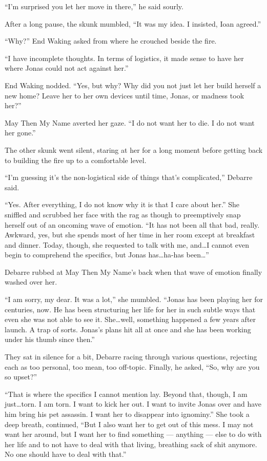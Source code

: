 ``I'm surprised you let her move in there,'' he said sourly.

After a long pause, the skunk mumbled, ``It was my idea. I insisted, Ioan agreed.''

``Why?'' End Waking asked from where he crouched beside the fire.

``I have incomplete thoughts. In terms of logistics, it made sense to have her where Jonas could not act against her.''

End Waking nodded. ``Yes, but why? Why did you not just let her build herself a new home? Leave her to her own devices until time, Jonas, or madness took her?''

May Then My Name averted her gaze. ``I do not want her to die. I do not want her gone.''

The other skunk went silent, staring at her for a long moment before getting back to building the fire up to a comfortable level.

``I'm guessing it's the non-logistical side of things that's complicated,'' Debarre said.

``Yes. After everything, I do not know why it is that I care about her.'' She sniffled and scrubbed her face with the rag as though to preemptively snap herself out of an oncoming wave of emotion. ``It has not been all that bad, really. Awkward, yes, but she spends most of her time in her room except at breakfast and dinner. Today, though, she requested to talk with me, and\ldots I cannot even begin to comprehend the specifics, but Jonas has\ldots ha-has been\ldots{}''

Debarre rubbed at May Then My Name's back when that wave of emotion finally washed over her.

``I am sorry, my dear. It was a lot,'' she mumbled. ``Jonas has been playing her for centuries, now. He has been structuring her life for her in such subtle ways that even she was not able to see it. She\ldots well, something happened a few years after launch. A trap of sorts. Jonas's plans hit all at once and she has been working under his thumb since then.''

They sat in silence for a bit, Debarre racing through various questions, rejecting each as too personal, too mean, too off-topic. Finally, he asked, ``So, why are you so upset?''

``That is where the specifics I cannot mention lay. Beyond that, though, I am just\ldots torn. I am torn. I want to kick her out. I want to invite Jonas over and have him bring his pet assassin. I want her to disappear into ignominy.'' She took a deep breath, continued, ``But I also want her to get out of this mess. I may not want her around, but I want her to find something — anything — else to do with her life and to not have to deal with that living, breathing sack of shit anymore. No one should have to deal with that.''

